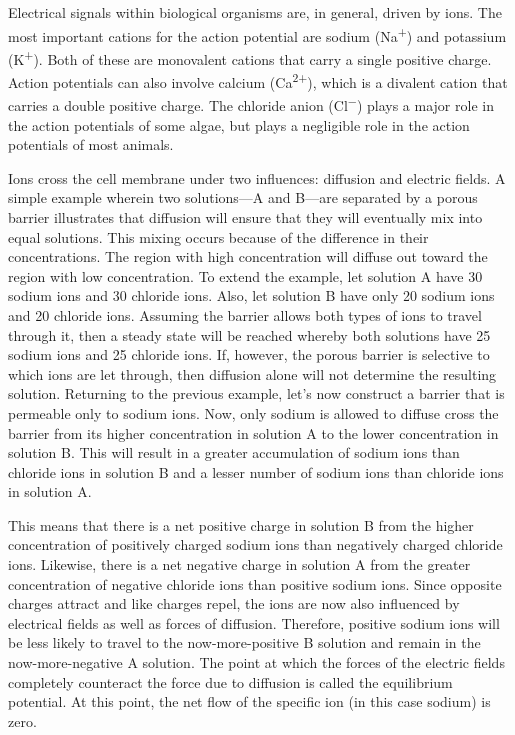 Electrical signals within biological organisms are, in general, driven by ions. The most important cations for the action potential are sodium (Na\textsuperscript{+}) and potassium (K\textsuperscript{+}). Both of these are monovalent cations that carry a single positive charge. Action potentials can also involve calcium (Ca\textsuperscript{2+}), which is a divalent cation that carries a double positive charge. The chloride anion (Cl\textsuperscript{−}) plays a major role in the action potentials of some algae, but plays a negligible role in the action potentials of most animals.

Ions cross the cell membrane under two influences: diffusion and electric fields. A simple example wherein two solutions---A and B---are separated by a porous barrier illustrates that diffusion will ensure that they will eventually mix into equal solutions. This mixing occurs because of the difference in their concentrations. The region with high concentration will diffuse out toward the region with low concentration. To extend the example, let solution A have 30 sodium ions and 30 chloride ions. Also, let solution B have only 20 sodium ions and 20 chloride ions. Assuming the barrier allows both types of ions to travel through it, then a steady state will be reached whereby both solutions have 25 sodium ions and 25 chloride ions. If, however, the porous barrier is selective to which ions are let through, then diffusion alone will not determine the resulting solution. Returning to the previous example, let's now construct a barrier that is permeable only to sodium ions. Now, only sodium is allowed to diffuse cross the barrier from its higher concentration in solution A to the lower concentration in solution B. This will result in a greater accumulation of sodium ions than chloride ions in solution B and a lesser number of sodium ions than chloride ions in solution A.

This means that there is a net positive charge in solution B from the higher concentration of positively charged sodium ions than negatively charged chloride ions. Likewise, there is a net negative charge in solution A from the greater concentration of negative chloride ions than positive sodium ions. Since opposite charges attract and like charges repel, the ions are now also influenced by electrical fields as well as forces of diffusion. Therefore, positive sodium ions will be less likely to travel to the now-more-positive B solution and remain in the now-more-negative A solution. The point at which the forces of the electric fields completely counteract the force due to diffusion is called the equilibrium potential. At this point, the net flow of the specific ion (in this case sodium) is zero.

